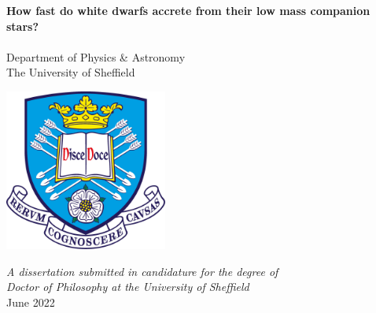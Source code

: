 \documentclass[a4paper,12pt,oneside,openright]{report}
\newcommand\blankpage{%
    \null
    \thispagestyle{empty}%
    \addtocounter{page}{-1}%
    \newpage}
\begin{document}
\begin{center}
\fontsize{24.88}{57.6}
\vspace*{-1cm}

\textbf{How fast do white dwarfs accrete from their low mass companion stars?}\\
\vspace*{2.5cm}
\LARGE
{}\\
\vspace{2cm}
\Large{Department of Physics \& Astronomy}\\
\Large{The University of Sheffield}\\
\vspace*{1cm}

\includegraphics[width=0.4\textwidth]{./figures/logo/tuoslogo2.jpg}\\

\vspace*{1cm}

\large
{\it A dissertation submitted in candidature for the degree of}\\
{\it Doctor of Philosophy at the University of Sheffield}\\
\vspace*{1.5cm}
{June 2022}
\vfill
\end{center}
\afterpage{\blankpage}


\normalsize




\end{document}
